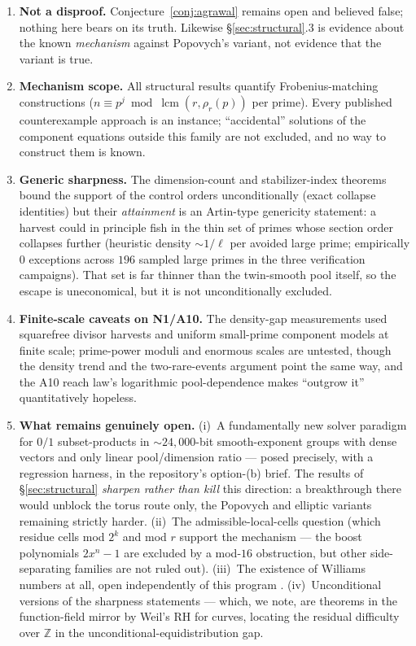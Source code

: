 \documentclass[11pt]{article}
\theoremstyle{remark}
\newcommand{\Z}{\mathbb{Z}}
\DeclareMathOperator{\lcm}{lcm}
\begin{document}
\begin{enumerate}\itemsep2pt
\item \textbf{Not a disproof.} Conjecture~\ref{conj:agrawal} remains open
and believed false; nothing here bears on its truth. Likewise
\S\ref{sec:structural}.3 is evidence about the known \emph{mechanism}
against Popovych's variant, not evidence that the variant is true.
\item \textbf{Mechanism scope.} All structural results quantify
Frobenius-matching constructions ($n \equiv p^{j} \bmod
\lcm(r, \rho_r(p))$ per prime). Every published counterexample approach
\cite{LPremarks,Popovych09,HD21} is an instance; ``accidental''
solutions of the component equations outside this family are not
excluded, and no way to construct them is known.
\item \textbf{Generic sharpness.} The dimension-count and
stabilizer-index theorems bound the support of the control orders
unconditionally (exact collapse identities) but their \emph{attainment}
is an Artin-type genericity statement: a harvest could in principle fish
in the thin set of primes whose section order collapses further
(heuristic density ${\sim}1/\ell$ per avoided large prime; empirically
$0$ exceptions across $196$ sampled large primes in the three
verification campaigns). That set is far
thinner than the twin-smooth pool itself, so the escape is uneconomical,
but it is not unconditionally excluded.
\item \textbf{Finite-scale caveats on N1/A10.} The density-gap
measurements used squarefree divisor harvests and uniform small-prime
component models at finite scale; prime-power moduli and enormous scales
are untested, though the density trend and the two-rare-events argument
point the same way, and the A10 reach law's logarithmic pool-dependence
makes ``outgrow it'' quantitatively hopeless.
\item \textbf{What remains genuinely open.} (i)~A fundamentally new
solver paradigm for $0/1$ subset-products in ${\sim}24{,}000$-bit
smooth-exponent groups with dense vectors and only linear pool/dimension
ratio --- posed precisely, with a regression harness, in the repository's
option-(b) brief. The results of \S\ref{sec:structural} \emph{sharpen
rather than kill} this direction: a breakthrough there would unblock the
torus route only, the Popovych and elliptic variants remaining strictly
harder.
(ii)~The admissible-local-cells question (which residue cells mod $2^k$
and mod $r$ support the mechanism --- the boost polynomials $2x^n - 1$
are excluded by a mod-$16$ obstruction, but other side-separating
families are not ruled out). (iii)~The existence of Williams numbers at
all, open independently of this program \cite{McIntoshMitra}.
(iv)~Unconditional versions of the sharpness statements --- which, we
note, are theorems in the function-field mirror by Weil's RH for curves,
locating the residual difficulty over $\Z$ in the
unconditional-equidistribution gap.
\end{enumerate}
\end{document}
